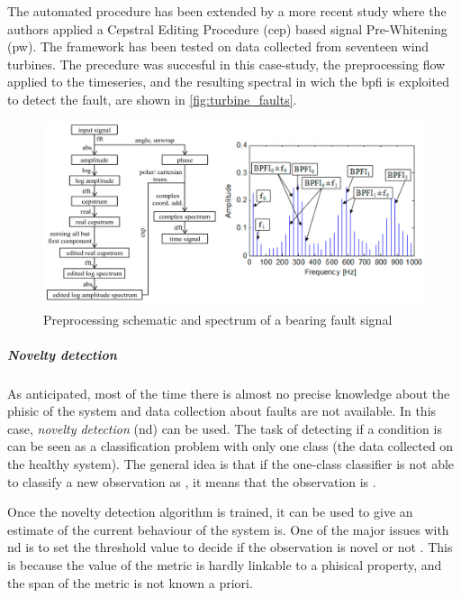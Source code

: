 The automated procedure \cite{sawalhi2008semi} has been extended by a more recent study \cite{schlechtingen2019automated} where the authors applied a Cepstral Editing Procedure (\gls{cep}) based signal Pre-Whitening (\gls{pw}). The framework has been tested on data collected from seventeen  wind turbines. The precedure was succesful in this case-study, the preprocessing flow applied to the timeseries, and the resulting spectral in wich the \gls{bpfi} is exploited to detect the fault, are shown in \autoref{fig:turbine_faults}.

\begin{figure}
    \centering
    \includegraphics[width=\textwidth]{images/StateArt/spectrum.png}
    \caption{Preprocessing schematic and spectrum of a bearing fault signal \cite{schlechtingen2019automated}}
    \label{fig:turbine_faults}
\end{figure}

\subparagraph*{Novelty detection}
As anticipated, most of the time there is almost no precise knowledge about the phisic of the system and data collection about faults are not available. In this case, \emph{novelty detection} (\gls{nd}) can be used. The task of detecting if a condition is  can be seen as a classification problem with only one class (the data collected on the healthy system). The general idea is that if the one-class classifier is not able to classify a new observation as , it means that the observation is .

Once the novelty detection algorithm is trained, it can be used to give an estimate of  the current behaviour of the system is. One of the major issues with \gls{nd} is to set the threshold value to decide if the observation is novel or not \cite{NoveltyReview}. This is because the value of the metric is hardly linkable to a phisical property, and the span of the metric is not known a priori.

